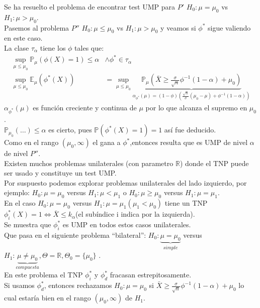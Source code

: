\documentclass[10pt]{article}
\theoremstyle{plain}
\theoremstyle{definition}
\begin{document}
Se ha resuelto el problema de encontrar test UMP para $P'$ $H_{0}: \mu=\mu_{0}$ vs $H_{1}: \mu>\mu_{0}$.\\
Pasemos al problema $P''$ $H_{0}: \mu \le \mu_{0}$ vs $H_{1}: \mu>\mu_{0}$ y veamos si $\phi^*$ sigue valiendo en este caso.\\
La clase $\tau_{\alpha}$ tiene los $\phi$ tales que:
\begin{align*}
\sup_{\mu\le\mu_{0}}\mathbb{P}_{\mu}(\phi(X)=1) \le \alpha & \land \phi^* \in \tau_{\alpha}\\
\sup_{\mu\le \mu_{0}} \mathbb{E}_{\mu}(\phi^*(X)) &= \sup_{\mu\le \mu_{0}} \underbrace{\mathbb{P}_{\mu}(\bar{X}\ge \frac{\sigma}{\sqrt{n}}\phi^{-1}(1-\alpha) + \mu_{0})}_{\alpha_{\phi^*}(\mu) = (1-\phi)\left(\frac{\sqrt{n}}{\sigma}(\mu_{0}-\mu )+ \phi^{-1}(1-\alpha)\right)} 
\end{align*}
$\alpha_{\phi^*}(\mu)$ es función creciente y continua de $\mu$ por lo que alcanza el supremo en $\mu_{0}$.\\
$\mathbb{P}_{\mu_{0}}(\ldots) \le \alpha$ es cierto, pues $\mathbb{P}(\phi^*(X)=1)=1$ así fue deducido.\\
Como en el rango $(\mu_{0},\infty)$ el gana a $\phi^*$,entonces resulta que es UMP de nivel $\alpha$ de nivel $P''$.\\

Existen muchos problemas unilaterales (con parametro $\mathbb{R}$) donde el TNP puede ser usado y constituye un test UMP.\\

Por suspuesto podemos explorar problemas unilaterales del lado izquierdo, por ejemplo: $H_{0}: \mu = \mu_{0}$ versus $H_{1}: \mu<\mu_{1}$ o $H_{0}: \mu \ge \mu_{0}$ versus $H_{1}: \mu=\mu_{1}$.\\

En el caso $H_{0}: \mu=\mu_{0}$ versus $H_{1}: \mu=\mu_{1} (\mu_{1}<\mu_{0})$ tiene un TNP $\phi_{i}^*(X)=1 \Leftrightarrow \bar{X}\le k_{\alpha}$(el subíndice i indica por la izquierda).\\

Se muestra que $\phi^*_{i}$ es UMP en todos estos casos unilaterales.\\

Que pasa en el siguiente problema ``bilateral'': $H_{0}: \underbrace{\mu=\mu_{0}}_{simple}$ versus $H_{1}: \underbrace{\mu\not = \mu_{0}}_{compuesta}, \Theta = \mathbb{R}, \Theta_{0}=\{\mu_{0}\}$ .\\

En este problema el TNP $\phi^*_{i}$ y $\phi^*_{d}$ fracasan estrepitosamente.\\
Si usamos $\phi_{d}^*$, entonces rechazamos $H_{0}:\mu=\mu_{0}$ si $\bar{X}\ge \frac{\sigma}{\sqrt{n}}\phi^{-1}(1-\alpha) + \mu_{0}$ lo cual estaría bien en el rango $(\mu_{0},\infty)$ de $H_{1}$.\\
\end{document}
